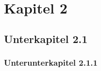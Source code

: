 \section{Kapitel 2}
\label{sec:Kapitel2}
\lipsum[1-1]

\subsection{Unterkapitel 2.1}
\label{subsec:Unterkapitel2.1}
\lipsum[2-2]

\subsubsection{Unterunterkapitel 2.1.1}

\lipsum[3-3]